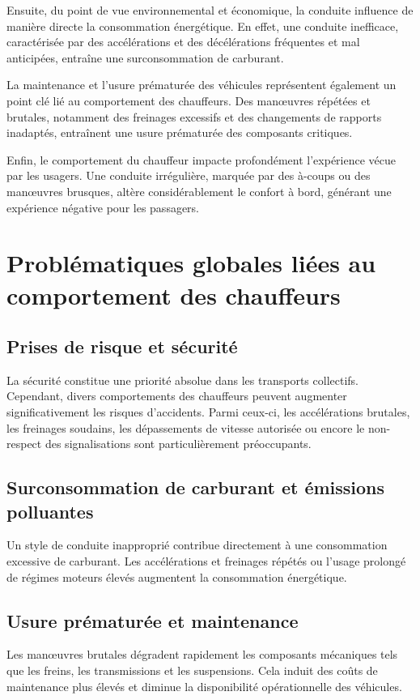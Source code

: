 \documentclass[a4paper, 12pt]{book}
\begin{document}
Ensuite, du point de vue environnemental et économique, la conduite influence de manière directe la consommation énergétique. En effet, une conduite inefficace, caractérisée par des accélérations et des décélérations fréquentes et mal anticipées, entraîne une surconsommation de carburant.

La maintenance et l'usure prématurée des véhicules représentent également un point clé lié au comportement des chauffeurs. Des manœuvres répétées et brutales, notamment des freinages excessifs et des changements de rapports inadaptés, entraînent une usure prématurée des composants critiques.

Enfin, le comportement du chauffeur impacte profondément l'expérience vécue par les usagers. Une conduite irrégulière, marquée par des à-coups ou des manœuvres brusques, altère considérablement le confort à bord, générant une expérience négative pour les passagers.

\section{Problématiques globales liées au comportement des chauffeurs}

\subsection{Prises de risque et sécurité}
La sécurité constitue une priorité absolue dans les transports collectifs. Cependant, divers comportements des chauffeurs peuvent augmenter significativement les risques d'accidents. Parmi ceux-ci, les accélérations brutales, les freinages soudains, les dépassements de vitesse autorisée ou encore le non-respect des signalisations sont particulièrement préoccupants.

\subsection{Surconsommation de carburant et émissions polluantes}
Un style de conduite inapproprié contribue directement à une consommation excessive de carburant. Les accélérations et freinages répétés ou l'usage prolongé de régimes moteurs élevés augmentent la consommation énergétique.

\subsection{Usure prématurée et maintenance}
Les manœuvres brutales dégradent rapidement les composants mécaniques tels que les freins, les transmissions et les suspensions. Cela induit des coûts de maintenance plus élevés et diminue la disponibilité opérationnelle des véhicules.
\end{document}
